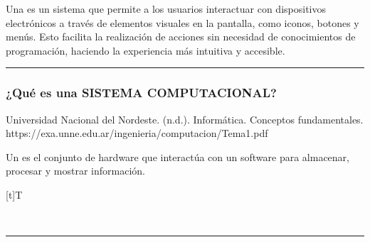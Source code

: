 \documentclass[letterpaper,10pt,spanish]{sphinxmanual}
\let\sphinxpxdimen\pdfpxdimen\else\newdimen\sphinxpxdimen
\begin{document}
\sphinxAtStartPar
Una  es un sistema que permite a los usuarios interactuar con dispositivos electrónicos a través de elementos visuales en la pantalla, como iconos, botones y menús. Esto facilita la realización de acciones sin necesidad de conocimientos de programación, haciendo la experiencia más intuitiva y accesible.


\bigskip\hrule\bigskip



\subsubsection{¿Qué es una SISTEMA COMPUTACIONAL?}
\label{\detokenize{1_guias/8logica/G821:que-es-una-sistema-computacional}}
\sphinxAtStartPar
%
\begin{footnote}[2]\sphinxAtStartFootnote
Universidad Nacional del Nordeste. (n.d.). Informática. Conceptos fundamentales. https://exa.unne.edu.ar/ingenieria/computacion/Tema1.pdf
%
\end{footnote} Un  es el conjunto de hardware que interactúa con un software para almacenar, procesar y mostrar información.


\begin{savenotes}\sphinxattablestart
\sphinxthistablewithglobalstyle
\centering
\begin{tabulary}{\linewidth}[t]{T}
\sphinxtoprule
\sphinxtableatstartofbodyhook

\begin{sphinxfigure-in-table}
\centering
\capstart
\noindent\sphinxincludegraphics[width=300\sphinxpxdimen]{{image048}.png}
\label{\detokenize{1_guias/8logica/G821:id16}}\end{sphinxfigure-in-table}\relax
\\
\sphinxbottomrule
\end{tabulary}
\sphinxtableafterendhook\par
\sphinxattableend\end{savenotes}


\bigskip\hrule\bigskip
\end{document}
